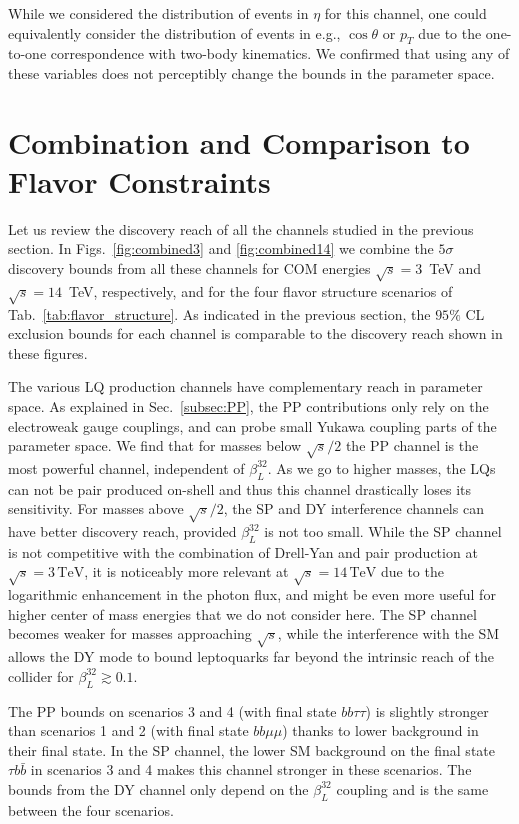 \documentclass[a4paper,11pt]{article}
\begin{document}
While we considered the distribution of events in $\eta$ for this channel, one could equivalently consider the distribution of events in e.g., $\cos\theta$ or $p_T$ due to the one-to-one correspondence with two-body kinematics. 
We confirmed that using any of these variables does not perceptibly change the bounds in the parameter space. 


\section{Combination and Comparison to Flavor Constraints}

\label{sec:comparison}


Let us review the discovery reach of all the channels studied in the previous section. In Figs.~\ref{fig:combined3} and \ref{fig:combined14} we combine the $5\sigma$ discovery bounds from all these channels for COM energies $\sqrt{s}=3$~TeV and $\sqrt{s}=14$~TeV, respectively, and for the four flavor structure scenarios of Tab.~\ref{tab:flavor_structure}. 
As indicated in the previous section, the $95\%$ CL exclusion bounds for each channel is comparable to the discovery reach shown in these figures.


The various LQ production channels have complementary reach in parameter space. As explained in Sec.~\ref{subsec:PP}, the PP contributions only rely on the electroweak gauge couplings, and can probe small Yukawa coupling parts of the parameter space. 
We find that for masses below $\sqrt{s}/2$ the PP channel is the most powerful channel, independent of $\beta_L^{32}$. 
As we go to higher masses, the LQs can not be pair produced on-shell and thus this channel drastically loses its sensitivity. 
For masses above $\sqrt{s}/2$, the SP and DY interference channels can have better discovery reach, provided $\beta_L^{32}$ is not too small.
While the SP channel is not competitive with the combination of Drell-Yan and pair production at $\sqrt{s} = 3\,\textrm{TeV}$, it is noticeably more relevant at $\sqrt{s} = 14\,\textrm{TeV}$ due to the logarithmic enhancement in the photon flux, and might be even more useful for higher center of mass energies that we do not consider here. 
The SP channel becomes weaker for masses approaching $\sqrt{s}$, while the interference with the SM allows the DY mode to bound leptoquarks far beyond the intrinsic reach of the collider for $\beta_L^{32} \gtrsim 0.1$. 



The PP bounds on scenarios 3 and 4 (with final state $bb\tau \tau$) is slightly stronger than scenarios 1 and 2 (with final state $bb\mu \mu$) thanks to lower background in their final state. 
In the SP channel, the lower SM background on the final state $\tau b \bar{b}$ in scenarios 3 and 4 makes this channel stronger in these scenarios. The bounds from the DY channel only depend on the $\beta_L^{32}$ coupling and is the same between the four scenarios.
\end{document}
